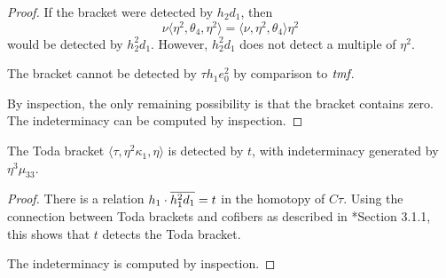 \begin{proof}
If the bracket were detected by $h_2 d_1$, then
\[
\nu \langle \eta^2, \theta_4, \eta^2 \rangle =
\langle \nu, \eta^2, \theta_4 \rangle \eta^2
\]
would be detected by $h_2^2 d_1$.
However, $h_2^2 d_1$ does not detect a multiple of $\eta^2$.

The bracket cannot be detected by $\tau h_1 e_0^2$ by 
comparison to $\textit{tmf}$.

By inspection, the only remaining possibility is that
the bracket contains zero.  The indeterminacy can be computed
by inspection.
\end{proof}

\begin{lemma}
\label{lem:t,eta^2kappa1,eta}
The Toda bracket $\langle \tau, \eta^2 \kappa_1, \eta \rangle$
is detected by $t$, with indeterminacy generated by
$\eta^3 \mu_{33}$.
\end{lemma}

\begin{proof}
There is a relation
$h_1 \cdot \overline{h_1^2 d_1} = t$ in the homotopy of $C\tau$.
Using the connection between Toda brackets and cofibers
as described in \cite{Isaksen14c}*{Section 3.1.1},
this shows that $t$ detects the Toda bracket.

The indeterminacy is computed by inspection.
\end{proof}


